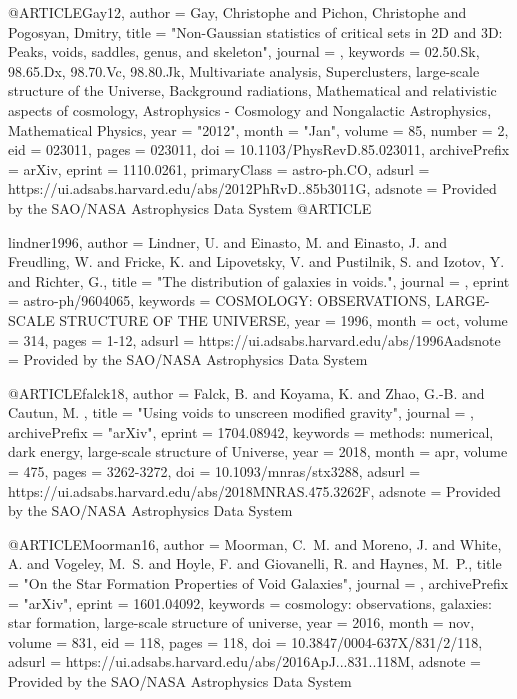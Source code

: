 \documentclass{aa}
\begin{document}
{{{@ARTICLE{Gay12,
       author = {{Gay}, Christophe and {Pichon}, Christophe and {Pogosyan}, Dmitry},
        title = "{Non-Gaussian statistics of critical sets in 2D and 3D: Peaks, voids, saddles, genus, and skeleton}",
      journal = {\prd},
     keywords = {02.50.Sk, 98.65.Dx, 98.70.Vc, 98.80.Jk, Multivariate analysis, Superclusters, large-scale structure of the Universe, Background radiations, Mathematical and relativistic aspects of cosmology, Astrophysics - Cosmology and Nongalactic Astrophysics, Mathematical Physics},
         year = "2012",
        month = "Jan",
       volume = {85},
       number = {2},
          eid = {023011},
        pages = {023011},
          doi = {10.1103/PhysRevD.85.023011},
archivePrefix = {arXiv},
       eprint = {1110.0261},
 primaryClass = {astro-ph.CO},
       adsurl = {https://ui.adsabs.harvard.edu/abs/2012PhRvD..85b3011G},
      adsnote = {Provided by the SAO/NASA Astrophysics Data System}
}
@ARTICLE{lindner1996,
   author = {{Lindner}, U. and {Einasto}, M. and {Einasto}, J. and {Freudling}, W. and 
	{Fricke}, K. and {Lipovetsky}, V. and {Pustilnik}, S. and {Izotov}, Y. and 
	{Richter}, G.},
    title = "{The distribution of galaxies in voids.}",
  journal = {\aap},
   eprint = {astro-ph/9604065},
 keywords = {COSMOLOGY: OBSERVATIONS, LARGE-SCALE STRUCTURE OF THE UNIVERSE},
     year = 1996,
    month = oct,
   volume = 314,
    pages = {1-12},
   adsurl = {https://ui.adsabs.harvard.edu/abs/1996Aadsnote = {Provided by the SAO/NASA Astrophysics Data System}
}



@ARTICLE{falck18,
   author = {{Falck}, B. and {Koyama}, K. and {Zhao}, G.-B. and {Cautun}, M.
	},
    title = "{Using voids to unscreen modified gravity}",
  journal = {\mnras},
archivePrefix = "arXiv",
   eprint = {1704.08942},
 keywords = {methods: numerical, dark energy, large-scale structure of Universe},
     year = 2018,
    month = apr,
   volume = 475,
    pages = {3262-3272},
      doi = {10.1093/mnras/stx3288},
   adsurl = {https://ui.adsabs.harvard.edu/abs/2018MNRAS.475.3262F},
  adsnote = {Provided by the SAO/NASA Astrophysics Data System}
}


@ARTICLE{Moorman16,
   author = {{Moorman}, C.~M. and {Moreno}, J. and {White}, A. and {Vogeley}, M.~S. and 
	{Hoyle}, F. and {Giovanelli}, R. and {Haynes}, M.~P.},
    title = "{On the Star Formation Properties of Void Galaxies}",
  journal = {\apj},
archivePrefix = "arXiv",
   eprint = {1601.04092},
 keywords = {cosmology: observations, galaxies: star formation, large-scale structure of universe},
     year = 2016,
    month = nov,
   volume = 831,
      eid = {118},
    pages = {118},
      doi = {10.3847/0004-637X/831/2/118},
   adsurl = {https://ui.adsabs.harvard.edu/abs/2016ApJ...831..118M},
  adsnote = {Provided by the SAO/NASA Astrophysics Data System}
}


}}}}
\end{document}
